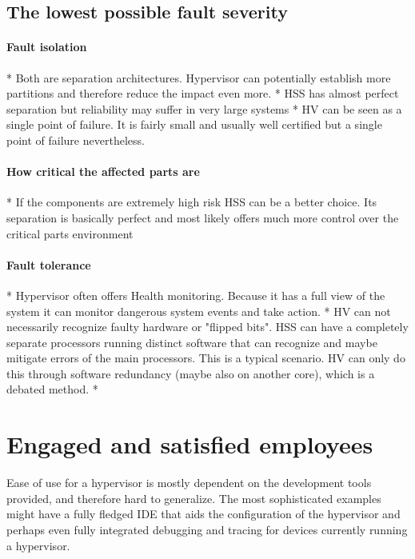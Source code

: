 \subsection{The lowest possible fault severity}
\paragraph{Fault isolation}
* Both are separation architectures. Hypervisor can potentially establish more partitions and therefore reduce the impact even more.
* HSS has almost perfect separation but reliability may suffer in very large systems
* HV can be seen as a single point of failure. It is fairly small and usually well certified but a single point of failure nevertheless. 
\paragraph{How critical the affected parts are}
* If the components are extremely high risk HSS can be a better choice. Its separation is basically perfect and most likely offers much more control over the critical parts environment
\paragraph{Fault tolerance}
* Hypervisor often offers Health monitoring. Because it has a full view of the system it can monitor dangerous system events and take action.
* HV can not necessarily recognize faulty hardware or "flipped bits". HSS can have a completely separate processors running distinct software that can recognize and maybe mitigate errors of the main processors. This is a typical scenario. HV can only do this through software redundancy (maybe also on another core), which is a debated method.
* 


\section{Engaged and satisfied employees}
Ease of use for a hypervisor is mostly dependent on the development tools provided, and therefore hard to generalize. The most sophisticated examples might have a fully fledged \gls{IDE} that aids the configuration of the hypervisor and perhaps even fully integrated debugging and tracing for devices currently running a hypervisor. %

